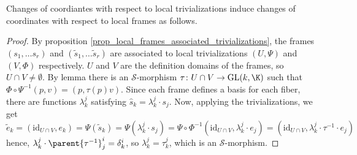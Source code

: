 Changes of coordiantes with respect to local trivializations induce changes of coordinates with respect to local frames as follows.
\begin{proof}
    By proposition \ref{prop_local_frames_associated_trivializations}, the frames \((s_1, \ldots s_r)\) and \((\tilde{s}_1, \ldots \tilde{s}_r)\) are associated to local trivializations \((U, \Psi)\) and \((V, \Phi)\) respectively. \(U\) and \(V\) are the definition domains of the frames, so \(U \cap V \neq \emptyset\). By lemma \parencite[Lemma 10.5]{lee_introSM} there is an \(\mathcal{S}\)-morphism \(\tau \colon U \cap V \to \mathrm{GL}(k, \K)\) such that \(\Phi\circ\Psi^{-1}(p,v)=(p, \tau(p)v)\). Since each frame defines a basis for each fiber, there are functions \(\lambda^j_k\) satisfying \(\hat{s}_k=\lambda^j_k \cdot s_j\). Now, applying the trivializations, we get
    \[
    \tilde{e}_k=(\mathrm{id}_{U \cap V}, e_k)=\Psi(\tilde{s}_k)=\Psi(\lambda^j_k\cdot s_j)= \Psi \circ \Phi^{-1}(\mathrm{id}_{U \cap V},\lambda^j_k \cdot e_j)=(\mathrm{id}_{U \cap V}, \lambda^j_k \cdot \tau^{-1}\cdot e_j)
    \]
    hence, \(\lambda^j_k \cdot \parent{\tau^{-1}}^i_j=\delta^i_k\), so \(\lambda^j_k=\tau^j_k\), which is an \(\mathcal{S}\)-morphism.
\end{proof}

